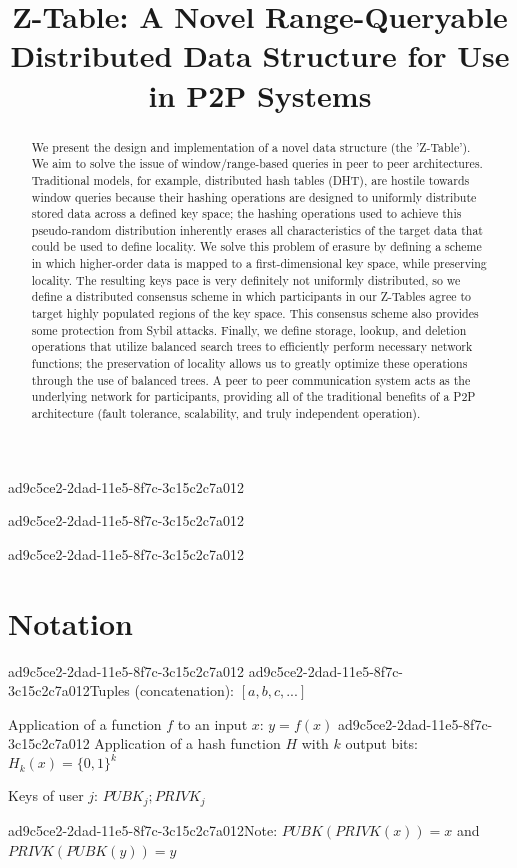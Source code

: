 \documentclass[12pt]{article}
\title{Z-Table: A Novel Range-Queryable Distributed Data Structure for Use in P2P Systems}
\begin{document}
ad9c5ce2-2dad-11e5-8f7c-3c15c2c7a012\maketitle

ad9c5ce2-2dad-11e5-8f7c-3c15c2c7a012\begin{abstract}
We present the design and implementation of a novel data structure (the 'Z-Table'). We aim to solve the issue of window/range-based queries in peer to peer architectures. Traditional models, for example,  distributed hash tables (DHT), are hostile towards window queries because their hashing operations are designed to uniformly distribute stored data across a defined key space; the hashing operations used to achieve this pseudo-random distribution inherently erases all characteristics of the target data that could be used to define locality. We solve this problem of erasure by defining a scheme in which higher-order data is mapped to a first-dimensional key space, while preserving locality. The resulting keys pace is very definitely not uniformly distributed, so we define a distributed consensus scheme in which participants in our Z-Tables agree to target highly populated regions of the key space. This consensus scheme also provides some protection from Sybil attacks. Finally, we define storage, lookup, and deletion operations that utilize balanced search trees to efficiently perform necessary network functions; the preservation of locality allows us to greatly optimize these operations through the use of balanced trees. A peer to peer communication system acts as the underlying network for participants, providing all of the traditional benefits of a P2P architecture (fault tolerance, scalability, and truly independent operation).
\end{abstract}

ad9c5ce2-2dad-11e5-8f7c-3c15c2c7a012\section{Notation}
ad9c5ce2-2dad-11e5-8f7c-3c15c2c7a012
ad9c5ce2-2dad-11e5-8f7c-3c15c2c7a012Tuples (concatenation): $[a,b,c,...]$

Application of a function $f$ to an input $x$: $y=f(x)$
ad9c5ce2-2dad-11e5-8f7c-3c15c2c7a012
Application of a hash function $H$ with $k$ output bits: $H_{k}(x) = \{0,1\}^k$

Keys of user $j$: $ PUBK_j; PRIVK_j $

ad9c5ce2-2dad-11e5-8f7c-3c15c2c7a012Note: $PUBK(PRIVK(x)) = x$ and $PRIVK(PUBK(y)) = y$~
\end{document}
